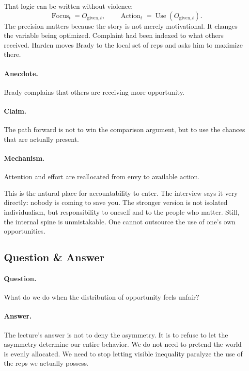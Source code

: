 That logic can be written without violence:
\begin{equation}
\operatorname{Focus}_t = O_{\text{given},t},
\qquad
\operatorname{Action}_t = \operatorname{Use}(O_{\text{given},t}).
\end{equation}
The precision matters because the story is not merely motivational. It changes the variable being optimized. Complaint had been indexed to what others received. Harden moves Brady to the local set of reps and asks him to maximize there.

\paragraph{Anecdote.} Brady complains that others are receiving more opportunity.

\paragraph{Claim.} The path forward is not to win the comparison argument, but to use the chances that are actually present.

\paragraph{Mechanism.} Attention and effort are reallocated from envy to available action.

This is the natural place for accountability to enter. The interview says it very directly: nobody is coming to save you. The stronger version is not isolated individualism, but responsibility to oneself and to the people who matter. Still, the internal spine is unmistakable. One cannot outsource the use of one's own opportunities.

\subsection{Question \& Answer}

\paragraph{Question.} What do we do when the distribution of opportunity feels unfair?

\paragraph{Answer.} The lecture's answer is not to deny the asymmetry. It is to refuse to let the asymmetry determine our entire behavior. We do not need to pretend the world is evenly allocated. We need to stop letting visible inequality paralyze the use of the reps we actually possess.

